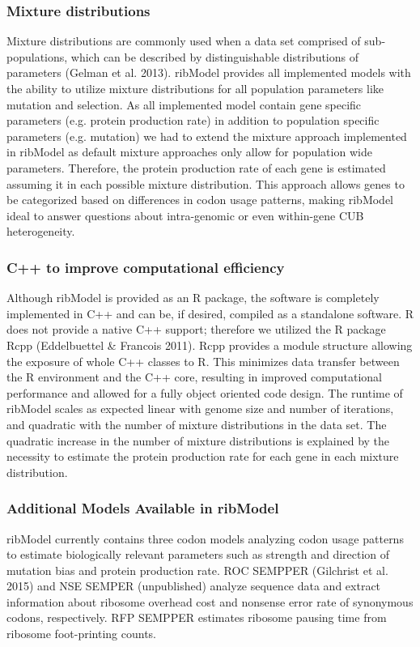 \documentclass{bioinfo}
\newcommand{\package}{ribModel } %
\begin{document}
\subsubsection*{Mixture distributions}
Mixture distributions are commonly used when a data set comprised of sub-populations, which can be described by distinguishable distributions of parameters (Gelman et al. 2013). \package provides all implemented models with the ability to utilize mixture distributions for all population parameters like mutation and selection. As all implemented model contain gene specific parameters (e.g. protein production rate) in addition to population specific parameters (e.g. mutation) we had to extend the mixture approach implemented in \package as default mixture approaches only allow for population wide parameters. Therefore, the protein production rate of each gene is estimated assuming it in each possible mixture distribution. This approach allows genes to be categorized based on differences in codon usage patterns, making \package ideal to answer questions about intra-genomic or even within-gene CUB heterogeneity. 

\subsubsection*{C++ to improve computational efficiency}
Although \package is provided as an R package, the software is completely implemented in C++ and can be, if desired, compiled as a standalone software.
R does not provide a native C++ support; therefore we utilized the R package Rcpp (Eddelbuettel \& Francois 2011). 
Rcpp provides a module structure allowing the exposure of whole C++ classes to R. 
This minimizes data transfer between the R environment and the C++ core, resulting in improved computational performance and allowed for a fully object oriented code design. 
The runtime of \package scales as expected linear with genome size and number of iterations, and quadratic with the number of mixture distributions in the data set. The quadratic increase in the number of mixture distributions is explained by the necessity to estimate the protein production rate for each gene in each mixture distribution.  

\subsubsection*{Additional Models Available in \package}
\package currently contains three codon models analyzing codon usage patterns to estimate biologically relevant parameters such as strength and direction of mutation bias and protein production rate. ROC SEMPPER (Gilchrist et al. 2015) and NSE SEMPER (unpublished) analyze sequence data and extract information about ribosome overhead cost and nonsense error rate of synonymous codons, respectively. RFP SEMPPER estimates ribosome pausing time from ribosome foot-printing counts.
\end{document}
